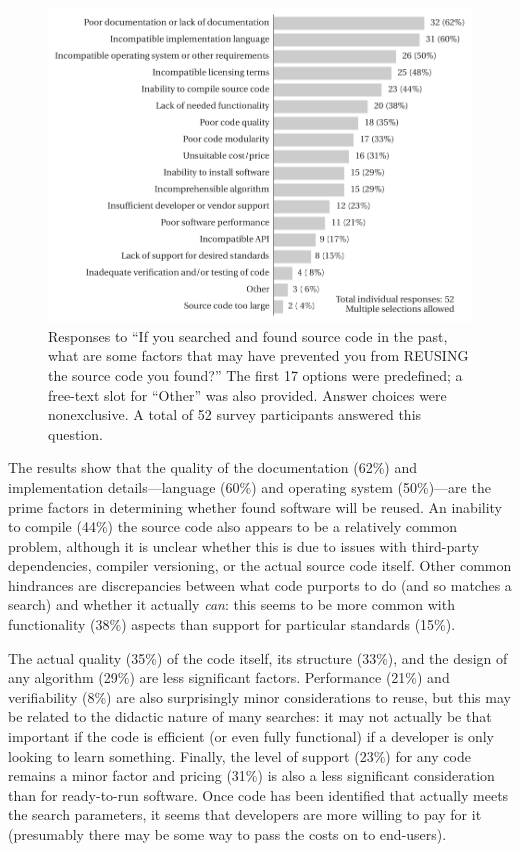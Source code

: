 \documentclass{casicswhitepaper}
\begin{document}
\begin{figure}[t]
  \centering
  \includegraphics{files/plots/hindrance-to-reusing-src.pdf}
  \vspace*{-1.5ex}
  \caption{Responses to ``If you searched and found source code in the past, what are some factors that may have prevented you from REUSING the source code you found?''  The first 17 options were predefined; a free-text slot for ``Other'' was also provided.  Answer choices were nonexclusive.  A total of 52 survey participants answered this question.}
  \label{hindrance-to-reusing-src}
\end{figure}

The results show that the quality of the documentation (62\%) and implementation details---language (60\%) and operating system (50\%)---are the prime factors in determining whether found software will be reused. An inability to compile (44\%) the source code also appears to be a relatively common problem, although it is unclear whether this is due to issues with third-party dependencies, compiler versioning, or the actual source code itself.  Other common hindrances are discrepancies between what code purports to do (and so matches a search) and whether it actually \emph{can}: this seems to be more common with functionality (38\%) aspects than support for particular standards (15\%).

The actual quality (35\%) of the code itself, its structure (33\%), and the design of any algorithm (29\%) are less significant factors. Performance (21\%) and verifiability (8\%) are also surprisingly minor considerations to reuse, but this may be related to the didactic nature of many searches: it may not actually be that important if the code is efficient (or even fully functional) if a developer is only looking to learn something.  Finally, the level of support (23\%) for any code remains a minor factor and pricing (31\%) is also a less significant consideration than for ready-to-run software. Once code has been identified that actually meets the search parameters, it seems that developers are more willing to pay for it (presumably there may be some way to pass the costs on to end-users).
\end{document}
